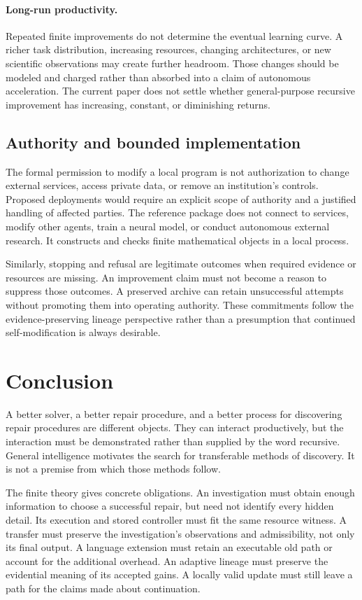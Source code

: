 \documentclass[11pt,letterpaper]{article}
\theoremstyle{plain}
\theoremstyle{definition}
\begin{document}
\paragraph{Long-run productivity.}
Repeated finite improvements do not determine the eventual learning curve. A richer task distribution, increasing resources, changing architectures, or new scientific observations may create further headroom. Those changes should be modeled and charged rather than absorbed into a claim of autonomous acceleration. The current paper does not settle whether general-purpose recursive improvement has increasing, constant, or diminishing returns.

\subsection{Authority and bounded implementation}
The formal permission to modify a local program is not authorization to change external services, access private data, or remove an institution's controls. Proposed deployments would require an explicit scope of authority and a justified handling of affected parties. The reference package does not connect to services, modify other agents, train a neural model, or conduct autonomous external research. It constructs and checks finite mathematical objects in a local process.

Similarly, stopping and refusal are legitimate outcomes when required evidence or resources are missing. An improvement claim must not become a reason to suppress those outcomes. A preserved archive can retain unsuccessful attempts without promoting them into operating authority. These commitments follow the evidence-preserving lineage perspective rather than a presumption that continued self-modification is always desirable.

\section{Conclusion}\label{sec:conclusion}
A better solver, a better repair procedure, and a better process for discovering repair procedures are different objects. They can interact productively, but the interaction must be demonstrated rather than supplied by the word recursive. General intelligence motivates the search for transferable methods of discovery. It is not a premise from which those methods follow.

The finite theory gives concrete obligations. An investigation must obtain enough information to choose a successful repair, but need not identify every hidden detail. Its execution and stored controller must fit the same resource witness. A transfer must preserve the investigation's observations and admissibility, not only its final output. A language extension must retain an executable old path or account for the additional overhead. An adaptive lineage must preserve the evidential meaning of its accepted gains. A locally valid update must still leave a path for the claims made about continuation.
\end{document}
